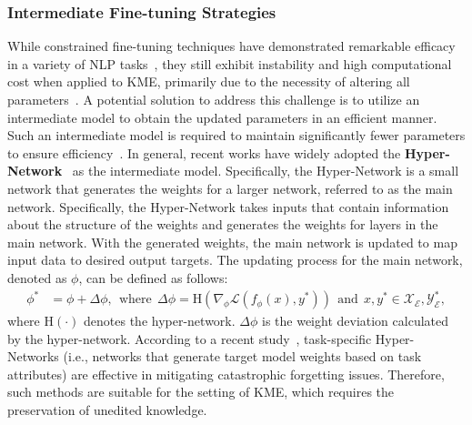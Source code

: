 \documentclass[acmsmall, screen]{acmart}
\begin{document}
\subsubsection{\textbf{Intermediate Fine-tuning Strategies}}
While constrained fine-tuning techniques have demonstrated remarkable efficacy in a variety of NLP tasks~\cite{wortsman2022robust,ziegler2019fine,bakker2022fine}, they still exhibit instability and high computational cost when applied to KME, primarily due to the necessity of altering all parameters~\cite{yao2023editing}. A potential solution to address this challenge is to utilize an intermediate model to obtain the updated parameters in an efficient manner. Such an intermediate model is required to maintain significantly fewer parameters to ensure efficiency~\cite{cheng2023editing}. In general, recent works have widely adopted the \textbf{Hyper-Network}~\cite{ha2016hypernetworks} as the intermediate model. Specifically, the Hyper-Network is a small network that generates the weights for a larger network, referred to as the main network. Specifically, the Hyper-Network takes inputs that contain information about the structure of the weights and generates the weights for layers in the main network. 
With the generated weights, the main network is updated to map input data to desired output targets. The updating process for the main network, denoted as $\phi$, can be defined as follows:
\begin{equation}
\begin{aligned}
     \phi^*&=\phi + \Delta\phi, \ \ \text{where}\ \ 
     \Delta\phi= \text{H}(\nabla_\phi\mathcal{L} (f_{\phi}(x), y^{*})) \ \  \text{and} \ \ 
    x, y^* \in \mathcal{X}_\mathcal{E}, \mathcal{Y}^*_\mathcal{E},
\end{aligned}
\end{equation}
where $\text{H}(\cdot)$ denotes the hyper-network. $\Delta\phi$ is the weight deviation calculated by the hyper-network. According to a recent study~\cite{vonoswald2022continual}, task-specific Hyper-Networks (i.e., networks that generate target model weights based on task attributes) are effective in mitigating catastrophic forgetting issues. Therefore, such methods are suitable for the setting of KME, which requires the preservation of unedited knowledge. 
\end{document}
